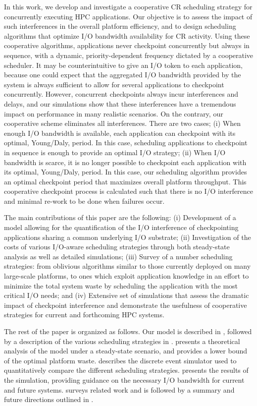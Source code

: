 \documentclass[conference,nofonttune]{IEEEtran}
\begin{document}
In this work, we develop and investigate a cooperative CR scheduling
strategy for concurrently executing HPC applications.  Our objective
is to assess the impact of such interferences in the overall platform
efficiency, and to design scheduling algorithms that optimize I/O
bandwidth availability for CR activity.  Using these cooperative
algorithms, applications never checkpoint concurrently but always in
sequence, with a dynamic, priority-dependent frequency dictated by a
cooperative scheduler.  It may be counterintuitive to give an I/O
token to each application, because one could expect that the
aggregated I/O bandwidth provided by the system is always sufficient
to allow for several applications to checkpoint concurrently.
However, concurrent checkpoints always incur interferences and delays,
and our simulations show that these interferences have a tremendous
impact on performance in many realistic scenarios.  On the contrary,
our cooperative scheme eliminates all interferences. There are two
cases; (i) When enough I/O bandwidth is available, each application
can checkpoint with its optimal, Young/Daly, period. In this case,
scheduling applications to checkpoint in sequence is enough to provide
an optimal I/O strategy; (ii) When I/O bandwidth is scarce, it is no
longer possible to checkpoint each application with its optimal,
Young/Daly, period. In this case, our scheduling algorithm provides an
optimal checkpoint period that maximizes overall platform
throughput. This cooperative checkpoint process is calculated such
that there is no I/O interference and minimal re-work to be done when
failures occur.

The main contributions of this paper are the following:
(i) Development of a model allowing for the quantification of
the I/O interference of checkpointing applications sharing a common underlying I/O
substrate; (ii)
Investigation of the costs of various I/O-aware scheduling
strategies through both steady-state analysis as well as detailed simulations; (iii)
Survey of a number scheduling strategies: from oblivious
algorithms similar to  those currently deployed on many large-scale platforms,
to ones which exploit application knowledge in an effort to  minimize the total
system waste by scheduling the application with the most critical I/O needs; and (iv)
Extensive set of simulations that assess the dramatic impact of checkpoint interference
and demonstrate the usefulness of cooperative strategies for current and forthcoming HPC systems.


The rest of the paper is organized as follows. Our model is described in
, followed by a description of the various scheduling
strategies in .  presents a
theoretical analysis of the model under a steady-state scenario, and provides a
lower bound of the optimal platform waste.  describes the
discrete event simulator used to quantitatively compare the different
scheduling strategies.   presents the results of the
simulation, providing guidance on the necessary I/O bandwidth for  current and
future systems.   surveys related work and is
followed by a summary and future directions outlined in .
\end{document}
